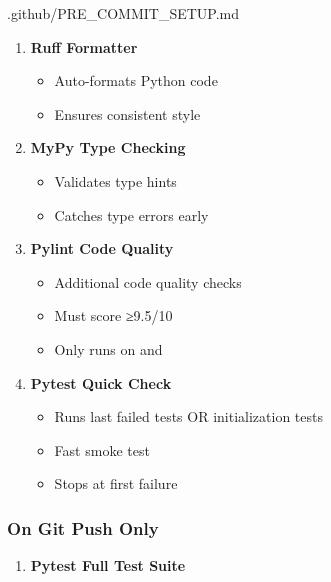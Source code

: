 \begin{relocated}{.github/PRE_COMMIT_SETUP.md}
\begin{enumerate}
  \begin{itemize}
  \tightlist
  \item
    Finds and fixes code quality issues
  \item
    Only runs on  and 
  \end{itemize}
\item
  \textbf{Ruff Formatter}

  \begin{itemize}
  \tightlist
  \item
    Auto-formats Python code
  \item
    Ensures consistent style
  \end{itemize}
\item
  \textbf{MyPy Type Checking}

  \begin{itemize}
  \tightlist
  \item
    Validates type hints
  \item
    Catches type errors early
  \end{itemize}
\item
  \textbf{Pylint Code Quality}

  \begin{itemize}
  \tightlist
  \item
    Additional code quality checks
  \item
    Must score ≥9.5/10
  \item
    Only runs on  and 
  \end{itemize}
\item
  \textbf{Pytest Quick Check}

  \begin{itemize}
  \tightlist
  \item
    Runs last failed tests OR initialization tests
  \item
    Fast smoke test
  \item
    Stops at first failure
  \end{itemize}
\end{enumerate}

\subsubsection{On Git Push Only}\label{um:flow:pre-commit-setup:on-git-push-only}

\begin{enumerate}
\def\labelenumi{\arabic{enumi}.}
\setcounter{enumi}{6}
\tightlist
\item
  \textbf{Pytest Full Test Suite}


\end{enumerate}
\end{relocated}
